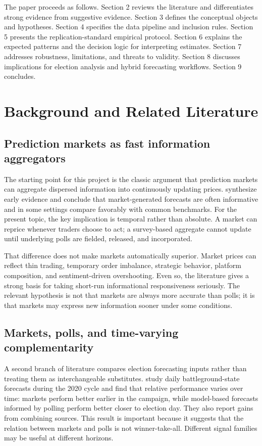 \documentclass[11pt]{article}
\begin{document}
The paper proceeds as follows. Section 2 reviews the literature and differentiates strong evidence from suggestive evidence. Section 3 defines the conceptual objects and hypotheses. Section 4 specifies the data pipeline and inclusion rules. Section 5 presents the replication-standard empirical protocol. Section 6 explains the expected patterns and the decision logic for interpreting estimates. Section 7 addresses robustness, limitations, and threats to validity. Section 8 discusses implications for election analysis and hybrid forecasting workflows. Section 9 concludes.

\section{Background and Related Literature}

\subsection{Prediction markets as fast information aggregators}
The starting point for this project is the classic argument that prediction markets can aggregate dispersed information into continuously updating prices. \citet{predictionmarkets2004aeaweb} synthesize early evidence and conclude that market-generated forecasts are often informative and in some settings compare favorably with common benchmarks. For the present topic, the key implication is temporal rather than absolute. A market can reprice whenever traders choose to act; a survey-based aggregate cannot update until underlying polls are fielded, released, and incorporated.

That difference does not make markets automatically superior. Market prices can reflect thin trading, temporary order imbalance, strategic behavior, platform composition, and sentiment-driven overshooting. Even so, the literature gives a strong basis for taking short-run informational responsiveness seriously. The relevant hypothesis is not that markets are always more accurate than polls; it is that markets may express new information sooner under some conditions.

\subsection{Markets, polls, and time-varying complementarity}
A second branch of literature compares election forecasting inputs rather than treating them as interchangeable substitutes. \citet{modelsmarketsandth2021arxiv} study daily battleground-state forecasts during the 2020 cycle and find that relative performance varies over time: markets perform better earlier in the campaign, while model-based forecasts informed by polling perform better closer to election day. They also report gains from combining sources. This result is important because it suggests that the relation between markets and polls is not winner-take-all. Different signal families may be useful at different horizons.
\end{document}
